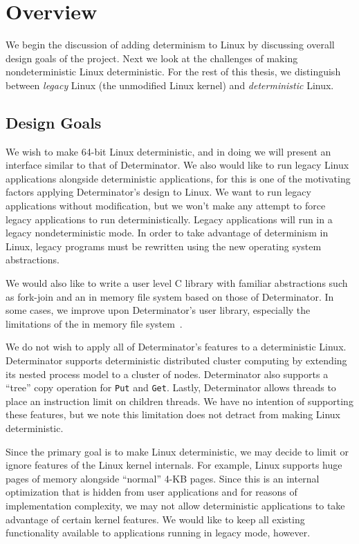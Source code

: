 \section{Overview}

We begin the discussion of adding determinism to Linux by discussing overall
design goals of the project. Next we look at the challenges of making
nondeterministic Linux deterministic. For the rest of this thesis, we
distinguish between \emph{legacy} Linux (the unmodified Linux kernel) and
\emph{deterministic} Linux.

\subsection{Design Goals}

We wish to make 64-bit Linux deterministic, and in doing we will present an
interface similar to that of Determinator. We also would like to run legacy
Linux applications alongside deterministic applications, for this is one of the
motivating factors applying Determinator's design to Linux. We want to run
legacy applications without modification, but we won't make any attempt to force
legacy applications to run deterministically. Legacy applications will run in a
legacy nondeterministic mode. In order to take advantage of determinism in
Linux, legacy programs must be rewritten using the new operating system
abstractions.

We would also like to write a user level C library with familiar abstractions
such as fork-join and an in memory file system based on those of Determinator.
In some cases, we improve upon Determinator's user library, especially the
limitations of the in memory file system~\cite{Aviram10,Aviram10cloud}.

We do not wish to apply all of Determinator's features to a deterministic Linux.
Determinator supports deterministic distributed cluster computing by extending
its nested process model to a cluster of nodes. Determinator also supports a
``tree'' copy operation for {\tt Put} and {\tt Get}. Lastly, Determinator allows
threads to place an instruction limit on children threads. We have no intention
of supporting these features, but we note this limitation does not detract from
making Linux deterministic.

Since the primary goal is to make Linux deterministic, we may decide
to limit or ignore features of the Linux kernel internals. For example, Linux
supports huge pages of memory alongside ``normal'' 4-KB pages. Since this is an
internal optimization that is hidden from user applications and for reasons of
implementation complexity, we may not allow deterministic applications to take
advantage of certain kernel features. We would like to keep all existing
functionality available to applications running in legacy mode, however.


